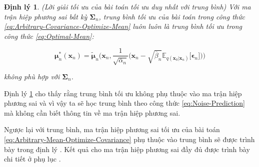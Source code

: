\documentclass[14pt, a4paper]{article}
\numberwithin{equation}{section}
\numberwithin{figure}{section}
\newtheorem{dl}{Định lý}
\numberwithin{dl}{section}
\numberwithin{md}{section}
\numberwithin{bd}{section}
\numberwithin{dn}{section}
\numberwithin{hq}{section}
\begin{document}
    \begin{dl} \label{dl:Solely-Optimal-Mean}
        (Lời giải tối ưu của bài toán tối ưu duy nhất với trung bình)
        Với ma trận hiệp phương sai bất kỳ $\boldsymbol{\Sigma}_n$,
        trung bình tối ưu của bài toán trong công thức \ref{eq:Arbitrary-Covariance-Optimize-Mean} luôn luôn là trung bình tối ưu trong công thức \ref{eq:Optimal-Mean}:

        \begin{equation*}
            \boldsymbol{\mu}_n^{\ast} (\boldsymbol{x}_n)=\tilde{\boldsymbol{\mu}}_n \Bigg( \boldsymbol{x}_n, \dfrac{1}{\sqrt{\overline{\alpha}_n}} \Big( \boldsymbol{x}_n - \sqrt{\overline{\beta}_n} \mathbb{E}_{q(\boldsymbol{x}_0 \vert \boldsymbol{x}_n)} \lbrack \boldsymbol{\epsilon}_n \rbrack \Big) \Bigg)
        \end{equation*}

        không phù hợp với $\boldsymbol{\Sigma}_n$.
    \end{dl}

    Định lý \ref{dl:Solely-Optimal-Mean} cho thấy rằng trung bình tối ưu không phụ thuộc vào ma trận hiệp phương sai và vì vậy ta sẽ học trung bình theo công thức \ref{eq:Noise-Prediction} mà không cần biết thông tin về ma trận hiệp phương sai.

    Ngược lại với trung bình, ma trận hiệp phương sai tối ưu của bài toán \ref{eq:Arbitrary-Mean-Optimize-Covariance} phụ thuộc vào trung bình sẽ được trình bày trong định lý .
    Kết quả cho ma trận hiệp phương sai đầy đủ được trình bày chi tiết ở phụ lục .
\end{document}
